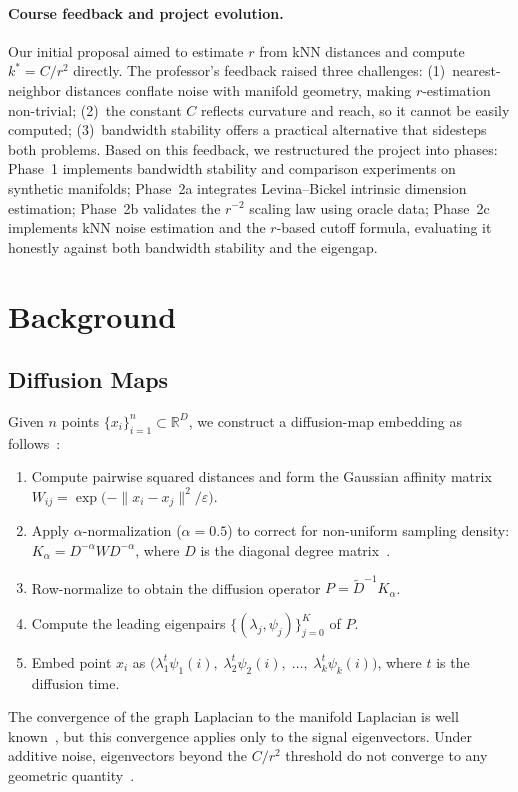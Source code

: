 \documentclass{article}
\begin{document}
\paragraph{Course feedback and project evolution.}
Our initial proposal aimed to estimate $r$ from kNN distances and compute $k^* = C/r^2$ directly. The professor's feedback raised three challenges: (1)~nearest-neighbor distances conflate noise with manifold geometry, making $r$-estimation non-trivial; (2)~the constant $C$ reflects curvature and reach, so it cannot be easily computed; (3)~bandwidth stability offers a practical alternative that sidesteps both problems. Based on this feedback, we restructured the project into phases: Phase~1 implements bandwidth stability and comparison experiments on synthetic manifolds; Phase~2a integrates Levina--Bickel intrinsic dimension estimation; Phase~2b validates the $r^{-2}$ scaling law using oracle data; Phase~2c implements kNN noise estimation and the $r$-based cutoff formula, evaluating it honestly against both bandwidth stability and the eigengap.

\section{Background}
\label{sec:background}

\subsection{Diffusion Maps}

Given $n$ points $\{x_i\}_{i=1}^n \subset \mathbb{R}^D$, we construct a diffusion-map embedding as follows~\citep{coifman2006diffusion}:
\begin{enumerate}
    \item Compute pairwise squared distances and form the Gaussian affinity matrix $W_{ij} = \exp\!\bigl(-\|x_i - x_j\|^2 / \varepsilon\bigr)$.
    \item Apply $\alpha$-normalization ($\alpha = 0.5$) to correct for non-uniform sampling density: $K_\alpha = D^{-\alpha} W D^{-\alpha}$, where $D$ is the diagonal degree matrix~\citep{coifman2006diffusion}.
    \item Row-normalize to obtain the diffusion operator $P = \tilde{D}^{-1} K_\alpha$.
    \item Compute the leading eigenpairs $\{(\lambda_j, \psi_j)\}_{j=0}^{K}$ of $P$.
    \item Embed point $x_i$ as $\bigl(\lambda_1^t \psi_1(i),\;\lambda_2^t \psi_2(i),\;\ldots,\;\lambda_k^t \psi_k(i)\bigr)$, where $t$ is the diffusion time.
\end{enumerate}
The convergence of the graph Laplacian to the manifold Laplacian is well known~\citep{singer2006graph, belkin2003laplacian}, but this convergence applies only to the signal eigenvectors. Under additive noise, eigenvectors beyond the $C/r^2$ threshold do not converge to any geometric quantity~\citep{elkaroui2016connection}.
\end{document}
